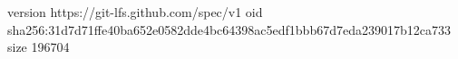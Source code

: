 version https://git-lfs.github.com/spec/v1
oid sha256:31d7d71ffe40ba652e0582dde4bc64398ac5edf1bbb67d7eda239017b12ca733
size 196704
